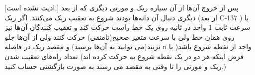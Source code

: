 [ادیت نشده است.]
\p 
        پس از خروج آن‌ها از آن سیاره ریک و مورتی دیگری که از بعد دیگری دنبال آن دانه‌ها بودند شروع به تعقیب ریک می‌کنند. اگر ریک (از بعد C-137 ) با سرعت ثابت 1 واحد در ثانیه روی یک خط راست حرکت کند و تعقیب کنندگان آن‌ها نیز روی همان خط ولی با سرعت متغیر صحیح(نامنفی) حرکت کنند ولی از آن‌ها جلو نزنند(می توانند به آن‌ها برسند) و مقصد ریک در فاصله n واحد از نقطه شروع باشد( با فرض اینکه هر دو در یک نقطه شروع به حرکت کرده اند) تعداد راه‌های تعقیب شدن ریک و مورتی را تا وقتی به مقصد می رسند به صورت بازگشتی حساب کنید.)
        
    